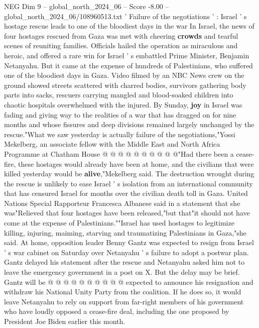 \begin{textsample}{NEG Dim 9 – global\_north\_2024\_06 – Score -8.00 – global\_north\_2024\_06/108960513.txt}  \label{ex:f9_neg_165}
' Failure of the negotiations ' : Israel ' s hostage rescue leads to one of the bloodiest days in the war In Israel, the news of four hostages rescued from Gaza was met with cheering \textbf{crowds} and tearful scenes of reuniting families.
Officials hailed the operation as miraculous and heroic, and offered a rare win for Israel ' s embattled Prime Minister, Benjamin Netanyahu.
But it came at the expense of hundreds of Palestinians, who suffered one of the bloodiest days in Gaza.
Video filmed by an NBC News crew on the ground showed streets scattered with charred bodies, survivors gathering body parts into sacks, rescuers carrying mangled and blood-soaked children into chaotic hospitals overwhelmed with the injured.
By Sunday, \textbf{joy} in Israel was fading and giving way to the realities of a war that has dragged on for nine months and whose fissures and deep divisions remained largely unchanged by the rescue."What we saw yesterday is actually failure of the negotiations,"Yossi Mekelberg, an associate fellow with the Middle East and North Africa Programme at Chatham House @ @ @ @ @ @ @ @ @ @"Had there been a cease-fire, these hostages would already have been at home, and the civilians that were killed yesterday would be \textbf{alive},"Mekelberg said.
The destruction wrought during the rescue is unlikely to ease Israel ' s isolation from an international community that has censured Israel for months over the civilian death toll in Gaza.
United Nations Special Rapporteur Francesca Albanese said in a statement that she was"Relieved that four hostages have been released,"but that"it should not have come at the expense of Palestinians.""Israel has used hostages to legitimize killing, injuring, maiming, starving and traumatizing Palestinians in Gaza,"she said.
At home, opposition leader Benny Gantz was expected to resign from Israel ' s war cabinet on Saturday over Netanyahu ' s failure to adopt a postwar plan.
Gantz delayed his statement after the rescue and Netanyahu asked him not to leave the emergency government in a post on X.
But the delay may be brief.
Gantz will be @ @ @ @ @ @ @ @ @ @ expected to announce his resignation and withdraw his National Unity Party from the coalition.
If he does so, it would leave Netanyahu to rely on support from far-right members of his government who have loudly opposed a cease-fire deal, including the one proposed by President Joe Biden earlier this month.

\end{textsample}
